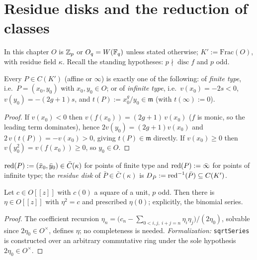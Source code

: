 \chapter{Residue disks and the reduction of classes}
In this chapter $O$ is $\mathbb{Z}_p$ or $O_q = W(\mathbb{F}_q)$ unless stated otherwise; $K' :=
\mathrm{Frac}(O)$, with residue field $\kappa$. Recall the standing hypotheses:
$p \nmid \operatorname{disc} f$ and $p$ odd.

\begin{lemma}
\label{lem:two-charts}
\leanok
Every $P \in C(K')$ (affine or $\infty$) is exactly one of the following: of
\emph{finite type}, i.e.\ $P = (x_0, y_0)$ with $x_0, y_0 \in O$; or of \emph{infinite
type}, i.e.\ $v(x_0) = -2s < 0$, $v(y_0) = -(2g+1)s$, and
$t(P) := x_0^g/y_0 \in \mathfrak m$ (with $t(\infty) := 0$).
\end{lemma}
\begin{proof}
\leanok
If $v(x_0) < 0$ then $v(f(x_0)) = (2g+1)\,v(x_0)$ ($f$ is monic, so the leading term
dominates), hence $2v(y_0) = (2g+1)v(x_0)$ and
$2\,v(t(P)) = -v(x_0) > 0$, giving $t(P) \in \mathfrak m$ directly. If $v(x_0)\ge 0$
then $v(y_0^2) = v(f(x_0)) \ge 0$, so $y_0 \in O$.
\end{proof}

\begin{definition}
\label{def:disk}
\leanok
{}
$\operatorname{red}(P) := (\bar x_0, \bar y_0) \in \bar C(\kappa)$ for points of finite type and
$\operatorname{red}(P) := \bar\infty$ for points of infinite type; the \emph{residue disk} of
$\bar P \in \bar C(\kappa)$ is $D_{\bar P} := \operatorname{red}^{-1}(\bar P) \subseteq C(K')$.
\end{definition}

\begin{lemma}
\label{lem:sqrt-series}
\leanok
Let $c \in O[[z]]$ with $c(0)$ a square of a unit, $p$ odd. Then there is
$\eta \in O[[z]]$ with $\eta^2 = c$ and prescribed $\eta(0)$; explicitly, the binomial
series.
\end{lemma}
\begin{proof}
\leanok
The coefficient recursion
$\eta_n = \bigl(c_n - \sum_{0<i,j,\ i+j=n}\eta_i\eta_j\bigr)/(2\eta_0)$, solvable since
$2\eta_0 \in O^\times$, defines $\eta$; no completeness is needed. \emph{Formalization:}
\texttt{sqrtSeries} is constructed over an arbitrary commutative ring under the sole
hypothesis $2\eta_0 \in O^\times$.
\end{proof}

